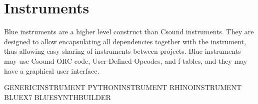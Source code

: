 \section{Instruments}\label{instruments}

Blue instruments are a higher level construct than Csound instruments.
They are designed to allow encapsulating all dependencies together with
the instrument, thus allowing easy sharing of instruments between
projects. Blue instruments may use Csound ORC code,
User-Defined-Opcodes, and f-tables, and they may have a graphical user
interface.

GENERICINSTRUMENT PYTHONINSTRUMENT RHINOINSTRUMENT BLUEX7
BLUESYNTHBUILDER
